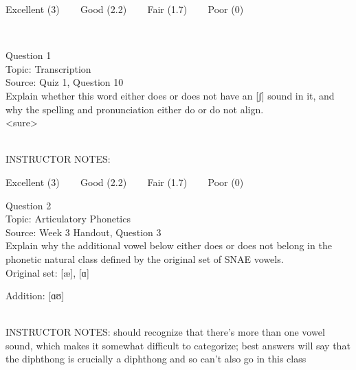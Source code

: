 \documentclass[12pt]{article}
\begin{document}
\vfill
Excellent (3) ~~~ Good (2.2) ~~~ Fair (1.7) ~~~ Poor (0)
\newpage

\begin{center}
\textbf{{\color{red}{\HUGE END OF EXAM}}}\\

\end{center}
\newpage

\begin{center}
\textbf{{\color{blue}{\HUGE START OF EXAM\\}}}

\textbf{{\color{blue}{\HUGE Student ID: 67125\\}}}

\textbf{{\color{blue}{\HUGE \\}}}

\end{center}
\newpage

{\large Question 1}\\

Topic: Transcription\\
Source: Quiz 1, Question 10\\

Explain whether this word either does or does not have an [ʃ] sound in it, and why the spelling and pronunciation either do or do not align.\\

<sure>


~\\
INSTRUCTOR NOTES: 


\vfill
Excellent (3) ~~~ Good (2.2) ~~~ Fair (1.7) ~~~ Poor (0)
\newpage

{\large Question 2}\\

Topic: Articulatory Phonetics\\
Source: Week 3 Handout, Question 3\\

Explain why the additional vowel below either does or does not belong in the phonetic natural class defined by the original set of SNAE vowels.\\

Original set: {[æ]}, {[ɑ]}

Addition: {[ɑʊ]}


~\\
INSTRUCTOR NOTES: should recognize that there's more than one vowel sound, which makes it somewhat difficult to categorize; best answers will say that the diphthong is crucially a diphthong and so can't also go in this class
\end{document}
